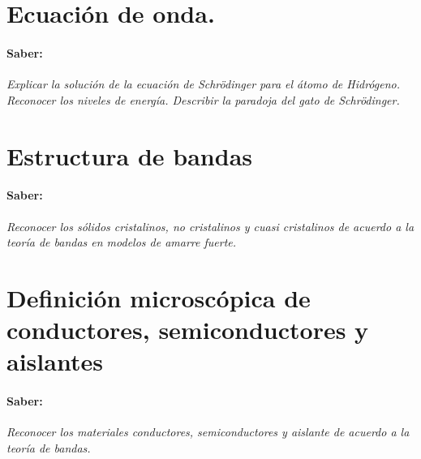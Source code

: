 \section{Ecuación de onda.}
\paragraph{Saber: }
\textit{Explicar la solución de la ecuación de Schrödinger 	para el átomo de Hidrógeno. Reconocer los niveles de energía. Describir la paradoja del gato de Schrödinger.}

\section{Estructura de 	bandas}
\paragraph{Saber: }
\textit{Reconocer los sólidos cristalinos, no cristalinos y cuasi cristalinos de acuerdo a la teoría de bandas en modelos de amarre fuerte.}

\section{Definición microscópica de conductores, semiconductores y aislantes}
\paragraph{Saber: }
\textit{Reconocer los materiales conductores, semiconductores y aislante de acuerdo a la teoría de bandas.}
